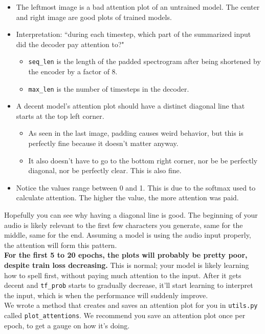 \documentclass{article}
\newcommand{\ttt}[1]{\texttt{#1}}
\begin{document}
\begin{itemize}
    \item The leftmost image is a bad attention plot of an untrained model. The center and right image are good plots of trained models.
    \item Interpretation: ``during each timestep, which part of the summarized input did the decoder pay attention to?"
    \begin{itemize}
        \item \ttt{seq\_len} is the length of the padded spectrogram after being shortened by the encoder by a factor of 8.
        \item \ttt{max\_len} is the number of timesteps in the decoder.
    \end{itemize}
    \item A decent model's attention plot should have a distinct diagonal line that starts at the top left corner.
    \begin{itemize}
        \item As seen in the last image, padding causes weird behavior, but this is perfectly fine because it doesn't matter anyway.
        \item It also doesn't have to go to the bottom right corner, nor be be perfectly diagonal, nor be perfectly clear. This is also fine.
    \end{itemize}
    \item Notice the values range between 0 and 1. This is due to the softmax used to calculate attention. The higher the value, the more attention was paid.
\end{itemize}

Hopefully you can see why having a diagonal line is good. The beginning of your audio is likely relevant to the first few characters you generate, same for the middle, same for the end. Assuming a model is using the audio input properly, the attention will form this pattern.\\

\textbf{For the first 5 to 20 epochs, the plots will probably be pretty poor, despite train loss decreasing.} This is normal; your model is likely learning how to spell first, without paying much attention to the input. After it gets decent and \ttt{tf\_prob} starts to gradually decrease, it'll start learning to interpret the input, which is when the performance will suddenly improve. \\

We wrote a method that creates and saves an attention plot for you in \ttt{utils.py} called \ttt{plot\_attentions}. We recommend you save an attention plot once per epoch, to get a gauge on how it's doing.
\end{document}
